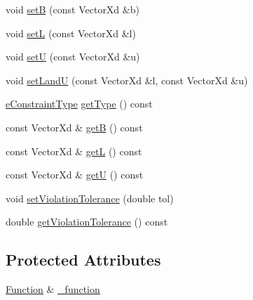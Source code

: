 {\bf }\par
\begin{DoxyCompactItemize}
\item 
void \hyperlink{classocra_1_1Constraint_3_01Function_01_4_a14893e8b8e01e60f0369ef6c934ca6ab}{setB} (const Vector\+Xd \&b)
\item 
void \hyperlink{classocra_1_1Constraint_3_01Function_01_4_a9bfbc2cff3d9ad7099f8f51228b541c4}{setL} (const Vector\+Xd \&l)
\item 
void \hyperlink{classocra_1_1Constraint_3_01Function_01_4_a80c1536eb85f6913a8d80a36456aa90a}{setU} (const Vector\+Xd \&u)
\item 
void \hyperlink{classocra_1_1Constraint_3_01Function_01_4_adbf50d4faf459c8e6469937b0501b5e2}{set\+LandU} (const Vector\+Xd \&l, const Vector\+Xd \&u)
\end{DoxyCompactItemize}

{\bf }\par
\begin{DoxyCompactItemize}
\item 
\hyperlink{namespaceocra_aedff92662043a7f15dc263363db7939b}{e\+Constraint\+Type} \hyperlink{classocra_1_1Constraint_3_01Function_01_4_ac436d107a3ea463a1306499702243aac}{get\+Type} () const 
\item 
const Vector\+Xd \& \hyperlink{classocra_1_1Constraint_3_01Function_01_4_aa38595794f61c7f5d273fdef29fd4bd2}{getB} () const 
\item 
const Vector\+Xd \& \hyperlink{classocra_1_1Constraint_3_01Function_01_4_af1e4eb44f3f07186e1f6f09712bbd159}{getL} () const 
\item 
const Vector\+Xd \& \hyperlink{classocra_1_1Constraint_3_01Function_01_4_a1ce8e8b6f19abc75e479ee35770874a2}{getU} () const 
\end{DoxyCompactItemize}

{\bf }\par
\begin{DoxyCompactItemize}
\item 
void \hyperlink{classocra_1_1Constraint_3_01Function_01_4_ac87f7fc6513adba1044b8f53f3fd2f5d}{set\+Violation\+Tolerance} (double tol)
\item 
double \hyperlink{classocra_1_1Constraint_3_01Function_01_4_a86235fa1fa597396a0f402beeb523269}{get\+Violation\+Tolerance} () const 
\end{DoxyCompactItemize}

\subsection*{Protected Attributes}
\begin{DoxyCompactItemize}
\item 
\hyperlink{classocra_1_1Function}{Function} \& \hyperlink{classocra_1_1Constraint_3_01Function_01_4_a51f8ef2f03da02c092aff7db27b325b6}{\+\_\+function}
\end{DoxyCompactItemize}
